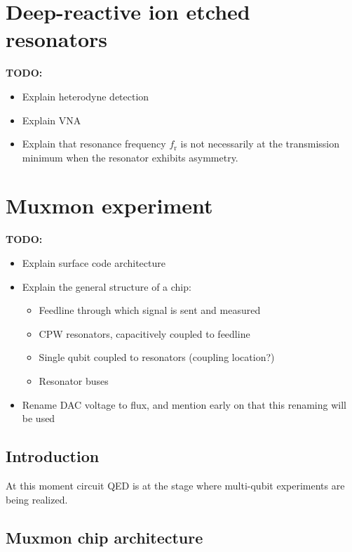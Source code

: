 \documentclass[12pt]{report}
\newcommand{\fres}{f_\text{r}}
\begin{document}
\part{Deep-reactive ion etched resonators}

\textbf{TODO:}
\begin{itemize}
  \item Explain heterodyne detection
  \item Explain VNA
  \item Explain that resonance frequency $\fres$ is not necessarily at the transmission minimum when the resonator exhibits asymmetry.
\end{itemize}





\part{Muxmon experiment}

  \textbf{TODO:}
  \begin{itemize}
    \item Explain surface code architecture
    \item Explain the general structure of a chip:
    \begin{itemize}
      \item Feedline through which signal is sent and measured
      \item CPW resonators, capacitively coupled to feedline
      \item Single qubit coupled to resonators (coupling location?)
      \item Resonator buses
    \end{itemize}
    \item Rename DAC voltage to flux, and mention early on that this renaming will be used
  \end{itemize}



  \chapter*{Introduction}

    At this moment circuit QED is at the stage where multi-qubit experiments are being realized.



  \chapter{Muxmon chip architecture}
\end{document}
